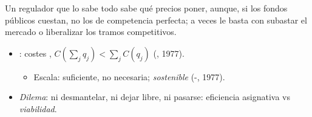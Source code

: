\documentclass{article}
\begin{document}
\begin{columnas}
\begin{ideaclave}
Un regulador que lo sabe todo sabe qué precios poner, aunque, si los fondos públicos cuestan, no los de competencia perfecta; a veces le basta con subastar el mercado o liberalizar los tramos competitivos.
\end{ideaclave}

\begin{itemize}
\item {}: costes , $C(\sum_jq_j)<\sum_jC(q_j)$ (, 1977).
  \begin{itemize}
  \item Escala: suficiente, no necesaria; \emph{sostenible} (-, 1977).
  \end{itemize}
\item \emph{Dilema}: ni desmantelar, ni dejar libre, ni pasarse: eficiencia asignativa vs \emph{viabilidad}.
\end{itemize}


\end{columnas}
\end{document}
